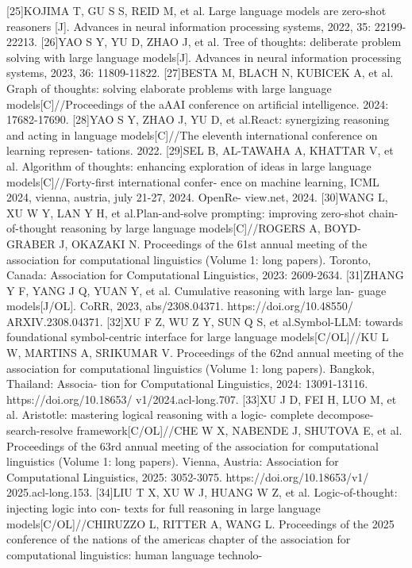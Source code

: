 \documentclass[12pt,a4paper,openright,UTF8]{ctexbook}
\begin{document}
[25]KOJIMA T, GU S S, REID M, et al. Large language models are zero-shot reasoners
[J]. Advances in neural information processing systems, 2022, 35: 22199-22213.
[26]YAO S Y, YU D, ZHAO J, et al. Tree of thoughts: deliberate problem solving
with large language models[J]. Advances in neural information processing systems,
2023, 36: 11809-11822.
[27]BESTA M, BLACH N, KUBICEK A, et al. Graph of thoughts: solving elaborate
problems with large language models[C]//Proceedings of the aAAI conference on
artificial intelligence. 2024: 17682-17690.
[28]YAO S Y, ZHAO J, YU D, et al.React: synergizing reasoning and acting in
language models[C]//The eleventh international conference on learning represen-
tations. 2022.
[29]SEL B, AL-TAWAHA A, KHATTAR V, et al. Algorithm of thoughts: enhancing
exploration of ideas in large language models[C]//Forty-first international confer-
ence on machine learning, ICML 2024, vienna, austria, july 21-27, 2024. OpenRe-
view.net, 2024.
[30]WANG L, XU W Y, LAN Y H, et al.Plan-and-solve prompting: improving
zero-shot chain-of-thought reasoning by large language models[C]//ROGERS A,
BOYD-GRABER J, OKAZAKI N. Proceedings of the 61st annual meeting of
the association for computational linguistics (Volume 1: long papers). Toronto,
Canada: Association for Computational Linguistics, 2023: 2609-2634.
[31]ZHANG Y F, YANG J Q, YUAN Y, et al. Cumulative reasoning with large lan-
guage models[J/OL]. CoRR, 2023, abs/2308.04371. https://doi.org/10.48550/
ARXIV.2308.04371.
[32]XU F Z, WU Z Y, SUN Q S, et al.Symbol-LLM: towards foundational
symbol-centric interface for large language models[C/OL]//KU L W, MARTINS
A, SRIKUMAR V. Proceedings of the 62nd annual meeting of the association for
computational linguistics (Volume 1: long papers). Bangkok, Thailand: Associa-
tion for Computational Linguistics, 2024: 13091-13116. https://doi.org/10.18653/
v1/2024.acl-long.707.
[33]XU J D, FEI H, LUO M, et al. Aristotle: mastering logical reasoning with a logic-
complete decompose-search-resolve framework[C/OL]//CHE W X, NABENDE J,
SHUTOVA E, et al. Proceedings of the 63rd annual meeting of the association for
computational linguistics (Volume 1: long papers). Vienna, Austria: Association
for Computational Linguistics, 2025: 3052-3075. https://doi.org/10.18653/v1/
2025.acl-long.153.
[34]LIU T X, XU W J, HUANG W Z, et al. Logic-of-thought: injecting logic into con-
texts for full reasoning in large language models[C/OL]//CHIRUZZO L, RITTER
A, WANG L. Proceedings of the 2025 conference of the nations of the americas
chapter of the association for computational linguistics: human language technolo-
\end{document}
